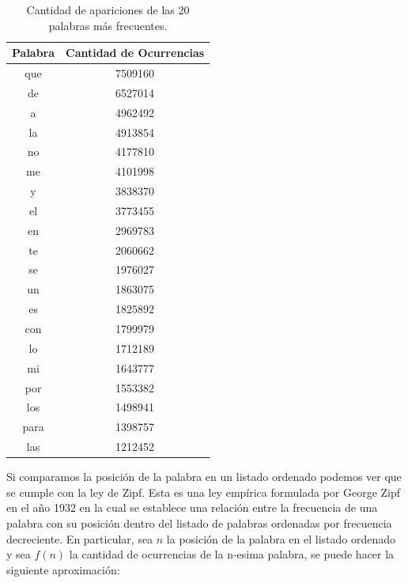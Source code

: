 \begin{table}[ht]
\centering
\label{tab:palabrasMasOcurrentes}
\begin{tabular}{|c|c|}
\hline
Palabra & Cantidad de Ocurrencias \\ \hline
que     & 7509160                 \\
de      & 6527014                 \\
a       & 4962492                 \\
la      & 4913854                 \\
no      & 4177810                 \\
me      & 4101998                 \\
y       & 3838370                 \\
el      & 3773455                 \\
en      & 2969783                 \\
te      & 2060662                 \\
se      & 1976027                 \\
un      & 1863075                 \\
es      & 1825892                 \\
con     & 1799979                 \\
lo      & 1712189                 \\
mi      & 1643777                 \\
por     & 1553382                 \\
los     & 1498941                 \\
para    & 1398757                 \\
las     & 1212452                 \\
\hline
\end{tabular}
\caption{Cantidad de apariciones de las 20 palabras más frecuentes.}

\end{table}

Si comparamos la posición de la palabra en un listado ordenado podemos ver que se cumple con la ley de Zipf. Esta es una ley empírica formulada por George Zipf en el año 1932 en la cual se establece una relación entre la frecuencia de una palabra con su posición dentro del listado de palabras ordenadas por frecuencia decreciente. En particular, sea $n$ la posición de la palabra en el listado ordenado y sea $f(n)$ la cantidad de ocurrencias de la n-esima palabra, se puede hacer la siguiente aproximación:

